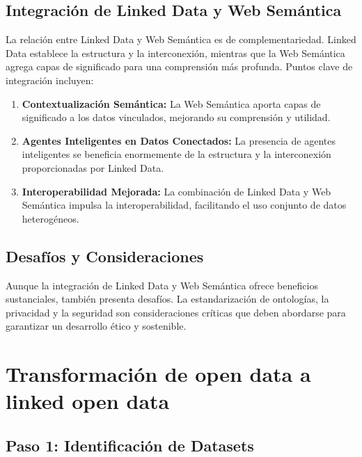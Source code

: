 \documentclass[11pt]{report}
\begin{document}
	\section{Integración de Linked Data y Web Semántica}
	
	La relación entre Linked Data y Web Semántica es de complementariedad. Linked Data establece la estructura y la interconexión, mientras que la Web Semántica agrega capas de significado para una comprensión más profunda. Puntos clave de integración incluyen:
	
	\begin{enumerate}
		\item \textbf{Contextualización Semántica:} La Web Semántica aporta capas de significado a los datos vinculados, mejorando su comprensión y utilidad.
		
		\item \textbf{Agentes Inteligentes en Datos Conectados:} La presencia de agentes inteligentes se beneficia enormemente de la estructura y la interconexión proporcionadas por Linked Data.
		
		\item \textbf{Interoperabilidad Mejorada:} La combinación de Linked Data y Web Semántica impulsa la interoperabilidad, facilitando el uso conjunto de datos heterogéneos.
	\end{enumerate}
	
	\section*{Desafíos y Consideraciones}
	
	Aunque la integración de Linked Data y Web Semántica ofrece beneficios sustanciales, también presenta desafíos. La estandarización de ontologías, la privacidad y la seguridad son consideraciones críticas que deben abordarse para garantizar un desarrollo ético y sostenible.
	
	\chapter{Transformación de open data a linked open data}
		  \section{Paso 1: Identificación de Datasets}
\end{document}
